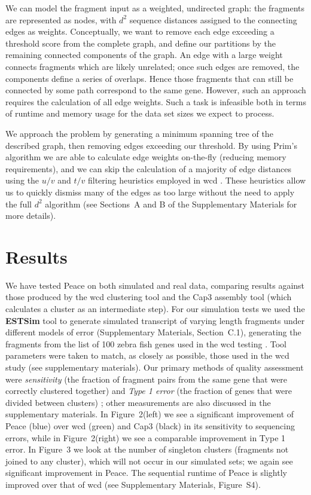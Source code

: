 \documentclass[a4,center,fleqn]{NAR}
\begin{document}
We can model the fragment input as a weighted, undirected graph: the fragments
are represented as nodes, with $d^2$ sequence distances assigned to
the connecting edges as weights.  Conceptually, we want to remove each
edge exceeding a threshold score from the complete graph, and define
our partitions by the remaining connected components of the graph.  An
edge with a large weight connects fragments which are likely unrelated;
once such edges are removed, the components define a series of
overlaps.  Hence those fragments that can still be connected by some path
correspond to the same gene.  However, such an approach requires the
calculation of all edge weights.  Such a task is infeasible both in terms of
runtime and memory usage for the data set sizes we expect to process.

We approach the problem by generating a minimum spanning tree of the
described graph, then removing edges exceeding our threshold.  By
using Prim's algorithm we are able to calculate edge weights
on-the-fly (reducing memory requirements), and we can skip the
calculation of a majority of edge distances using the $u/v$ and $t/v$
filtering heuristics employed in {\sc wcd} \cite{Hazelhurst08a}.
These heuristics allow us to quickly dismiss many of the edges as too
large without the need to apply the full $d^2$ algorithm (see
Sections~A and B of the Supplementary Materials for more details). 

\section{Results}

We have tested {\sc Peace} on both simulated and real data,
comparing results against those produced by the {\sc wcd}
clustering tool \cite{Hazelhurst08a} and the {\sc Cap3} assembly
tool \cite{Huang99} (which calculates a cluster as an intermediate
step).  For our simulation tests we used the {\bf ESTSim} tool
\cite{Hazelhurst03} to generate simulated transcript of varying length
fragments under different models
of error (Supplementary Materials, Section~C.1),
generating the fragments from the list of 100 zebra fish genes used in
the {\sc wcd} testing \cite{Hazelhurst08a}.  Tool parameters were
taken to match, as closely as possible, those used in the {\sc wcd}
study (see supplementary materials).  Our primary methods of quality
assessment were {\it sensitivity} (the fraction of fragment pairs from the
same gene that were correctly clustered together) and {\it Type 1
  error} (the fraction of genes that were divided between clusters)
\cite{Wang04,Hazelhurst08a}; other measurements are also discussed
in the supplementary materials.  In Figure~2(left) we see a
significant improvement of {\sc Peace} (blue) over {\sc wcd}
(green) and {\sc Cap3} (black) in its sensitivity to sequencing
errors, while in Figure~2(right) we see a comparable
improvement in Type 1 error.  In Figure~3 we look at
the number of singleton clusters (fragments not joined to any cluster),
which will not occur in our simulated sets; we again see significant
improvement in {\sc Peace}.  The sequential runtime of
{\sc Peace} is slightly improved over that of {\sc wcd} (see
Supplementary Materials, Figure~S4).
\end{document}
